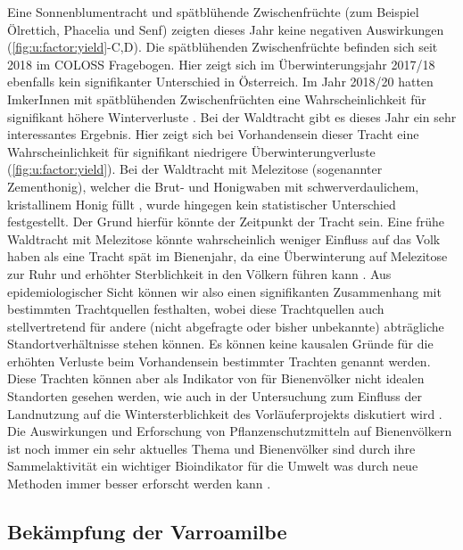 \newline
Eine Sonnenblumentracht und spätblühende Zwischenfrüchte (zum Beispiel Ölrettich, Phacelia und Senf) zeigten dieses Jahr keine negativen Auswirkungen (\cref{fig:u:factor:yield}-C,D). Die spätblühenden Zwischenfrüchte befinden sich seit 2018 im COLOSS Fragebogen. Hier zeigt sich im Überwinterungsjahr 2017/18 \citep{gray2019} ebenfalls kein signifikanter Unterschied in Österreich. Im Jahr 2018/20  hatten ImkerInnen mit spätblühenden Zwischenfrüchten eine Wahrscheinlichkeit für signifikant  höhere Winterverluste \citep{oberreiter2020}. 
\newline
Bei der Waldtracht gibt es dieses Jahr ein sehr interessantes Ergebnis. Hier zeigt sich bei Vorhandensein dieser Tracht eine Wahrscheinlichkeit für signifikant niedrigere Überwinterungverluste (\cref{fig:u:factor:yield}). Bei der Waldtracht mit Melezitose (sogenannter Zementhonig), welcher die Brut- und Honigwaben mit schwerverdaulichem, kristallinem Honig füllt \citep{pechhacker1990}, wurde hingegen kein statistischer Unterschied festgestellt. Der Grund hierfür könnte der Zeitpunkt der Tracht sein. Eine frühe Waldtracht mit Melezitose könnte wahrscheinlich weniger Einfluss auf das Volk haben als eine Tracht spät im Bienenjahr, da eine Überwinterung auf Melezitose zur Ruhr und erhöhter Sterblichkeit in den Völkern führen kann \citep{imdorf1985, seeburger2020}. 
\newline
Aus epidemiologischer Sicht können wir also einen signifikanten Zusammenhang mit bestimmten Trachtquellen festhalten, wobei diese Trachtquellen auch stellvertretend für andere (nicht abgefragte oder bisher unbekannte) abträgliche Standortverhältnisse stehen können. Es können keine kausalen Gründe für die erhöhten Verluste beim Vorhandensein bestimmter Trachten genannt werden. Diese Trachten können aber als Indikator von für Bienenvölker nicht idealen Standorten gesehen werden, wie auch in der Untersuchung zum Einfluss der Landnutzung auf die Wintersterblichkeit des Vorläuferprojekts diskutiert wird \citep{kuchling2018}. Die Auswirkungen und Erforschung von Pflanzenschutzmitteln auf Bienenvölkern ist noch immer ein sehr aktuelles Thema und Bienenvölker sind durch ihre Sammelaktivität ein wichtiger Bioindikator für die Umwelt was durch neue Methoden immer besser erforscht werden kann \citep{murcia-morales2020}.

\subsection{Bekämpfung der Varroamilbe}

